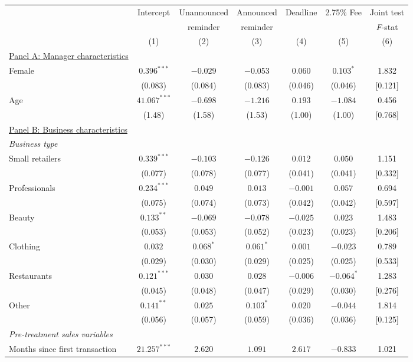\begin{tabular}{lcccccc}
\toprule
& Intercept & Unannounced & Announced & Deadline & 2.75\% Fee & Joint test \\
& & reminder & reminder & & & \textit{F}-stat \\
& (1) & (2) & (3) & (4) & (5) & (6)\\
\midrule
\underline{Panel A: Manager characteristics} \\
Female & $0.396^{***}$ & $-0.029$ & $-0.053$ & $0.060$ & $0.103^{*}$ & 1.832 \\
 & (0.083) & (0.084) & (0.083) & (0.046) & (0.046) & {}[0.121] \\
Age & $41.067^{***}$ & $-0.698$ & $-1.216$ & $0.193$ & $-1.084$ & 0.456 \\
 & (1.48) & (1.58) & (1.53) & (1.00) & (1.00) & {}[0.768] \\
\underline{Panel B: Business characteristics} \\
\emph{Business type} \\
\quad Small retailers & $0.339^{***}$ & $-0.103$ & $-0.126$ & $0.012$ & $0.050$ & 1.151 \\
 & (0.077) & (0.078) & (0.077) & (0.041) & (0.041) & {}[0.332] \\
\quad Professionals & $0.234^{***}$ & $0.049$ & $0.013$ & $-0.001$ & $0.057$ & 0.694 \\
 & (0.075) & (0.074) & (0.073) & (0.042) & (0.042) & {}[0.597] \\
\quad Beauty & $0.133^{**}$ & $-0.069$ & $-0.078$ & $-0.025$ & $0.023$ & 1.483 \\
 & (0.053) & (0.053) & (0.052) & (0.023) & (0.023) & {}[0.206] \\
\quad Clothing & $0.032$ & $0.068^{*}$ & $0.061^{*}$ & $0.001$ & $-0.023$ & 0.789 \\
 & (0.029) & (0.030) & (0.029) & (0.025) & (0.025) & {}[0.533] \\
\quad Restaurants & $0.121^{***}$ & $0.030$ & $0.028$ & $-0.006$ & $-0.064^{*}$ & 1.283 \\
 & (0.045) & (0.048) & (0.047) & (0.029) & (0.030) & {}[0.276] \\
\quad Other & $0.141^{**}$ & $0.025$ & $0.103^{*}$ & $0.020$ & $-0.044$ & 1.814 \\
 & (0.056) & (0.057) & (0.059) & (0.036) & (0.036) & {}[0.125] \\
\emph{Pre-treatment sales variables} \\
\quad Months since first transaction & $21.257^{***}$ & $2.620$ & $1.091$ & $2.617$ & $-0.833$ & 1.021 \\

\end{tabular}

